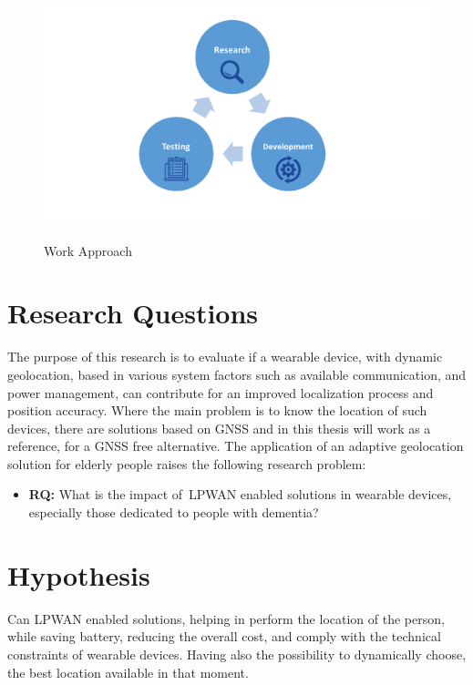 \begin{figure}[htbp]
  \centering
    {\includegraphics[height=2.5in,width=1\linewidth]{Chapters/Figures/r&d.png}}%
  \caption{Work Approach}
  \label{fig:WorkApp}
\end{figure}


\newpage
\section{Research Questions} %
\label{sec:research_question}

The purpose of this research is to evaluate if a wearable device, with dynamic geolocation,  based in various system factors such as available communication, and power management, can contribute for an improved localization process and position accuracy. Where the main problem is to know the location of such devices, there are solutions based on GNSS and in this thesis will work as a reference, for a GNSS free alternative. The application of an adaptive geolocation solution for elderly people raises the following research problem:

\begin{itemize}
	\item \textbf{RQ:} What is the impact of~\gls{LPWAN} enabled solutions in wearable devices, especially those dedicated to people with dementia?
\end{itemize} 

\section{Hypothesis}
\label{sec:hypothesis}

Can LPWAN enabled solutions, helping in perform the location of the person, while saving battery, reducing the overall cost, and comply with the technical constraints of wearable devices. Having also the possibility to dynamically choose, the best location available in that moment.



